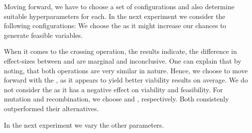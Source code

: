 \documentclass[./../../paper.tex]{subfiles}
\begin{document}
Moving forward, we have to choose a set of configurations and also determine suitable hyperparameters for each. In the next experiment we consider the following configurations: We choose the  as it might increase our chances to generate feasible variables. 

When it comes to the crossing operation, the results indicate, the difference in effect-sizes between  and  are marginal and inconclusive. One can explain that by noting, that both operations are very similar in nature. Hence, we choose to move forward with the , as it appears to yield better viability results on average. We do not consider the  as it has a negative effect on viability and feasibility. For mutation and recombination, we choose  and , respectively. Both consistenly outperformed their alternatives.

In the next experiment we vary the other parameters.
\end{document}
